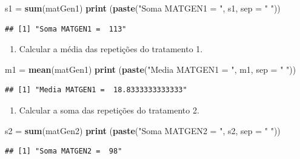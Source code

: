 \documentclass[
]{article}
\newenvironment{Shaded}{\begin{snugshade}}{\end{snugshade}}
\newcommand{\DataTypeTok}[1]{\textcolor[rgb]{0.13,0.29,0.53}{#1}}
\newcommand{\KeywordTok}[1]{\textcolor[rgb]{0.13,0.29,0.53}{\textbf{#1}}}
\newcommand{\NormalTok}[1]{#1}
\newcommand{\StringTok}[1]{\textcolor[rgb]{0.31,0.60,0.02}{#1}}
\providecommand{\tightlist}{%
  \setlength{\itemsep}{0pt}\setlength{\parskip}{0pt}}
\begin{document}
\begin{Shaded}
\begin{Highlighting}[]
\NormalTok{s1 =}\StringTok{ }\KeywordTok{sum}\NormalTok{(matGen1)}
\KeywordTok{print}\NormalTok{ (}\KeywordTok{paste}\NormalTok{(}\StringTok{"Soma MATGEN1 = "}\NormalTok{, s1, }\DataTypeTok{sep =} \StringTok{" "}\NormalTok{))}
\end{Highlighting}
\end{Shaded}

\begin{verbatim}
## [1] "Soma MATGEN1 =  113"
\end{verbatim}

\begin{enumerate}
\def\labelenumi{\arabic{enumi}.}
\setcounter{enumi}{2}
\tightlist
\item
  Calcular a média das repetições do tratamento 1.
\end{enumerate}

\begin{Shaded}
\begin{Highlighting}[]
\NormalTok{m1 =}\StringTok{ }\KeywordTok{mean}\NormalTok{(matGen1)}
\KeywordTok{print}\NormalTok{ (}\KeywordTok{paste}\NormalTok{(}\StringTok{"Media MATGEN1 = "}\NormalTok{, m1, }\DataTypeTok{sep =} \StringTok{" "}\NormalTok{))}
\end{Highlighting}
\end{Shaded}

\begin{verbatim}
## [1] "Media MATGEN1 =  18.8333333333333"
\end{verbatim}

\begin{enumerate}
\def\labelenumi{\arabic{enumi}.}
\setcounter{enumi}{3}
\tightlist
\item
  Calcular a soma das repetições do tratamento 2.
\end{enumerate}

\begin{Shaded}
\begin{Highlighting}[]
\NormalTok{s2 =}\StringTok{ }\KeywordTok{sum}\NormalTok{(matGen2)}
\KeywordTok{print}\NormalTok{ (}\KeywordTok{paste}\NormalTok{(}\StringTok{"Soma MATGEN2 = "}\NormalTok{, s2, }\DataTypeTok{sep =} \StringTok{" "}\NormalTok{))}
\end{Highlighting}
\end{Shaded}

\begin{verbatim}
## [1] "Soma MATGEN2 =  98"
\end{verbatim}
\end{document}
